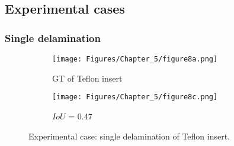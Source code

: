 \subsection{Experimental cases}
\label{sec532}

\subsubsection{Single delamination}
\label{sec5321}

\begin{figure} [!h]
	\centering
	\begin{subfigure}[b]{0.47\textwidth}
		\centering
		\texttt{[image: Figures/Chapter\_5/figure8a.png]}
		\caption{GT of Teflon insert}
		\label{fig:exp_CFRP_teflon_3o_GT}
	\end{subfigure}
	\begin{subfigure}[b]{0.47\textwidth}
		\centering
		\texttt{[image: Figures/Chapter\_5/figure8c.png]}
		\caption{\(IoU\) = 0.47}
		\label{fig:model_2_CFRP_teflon_3o}
	\end{subfigure}
	\caption{Experimental case: single delamination of Teflon insert.}
	\label{fig:exp_Teflon_insert}
\end{figure} 

